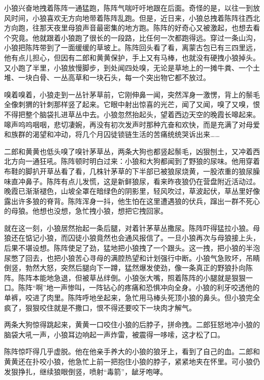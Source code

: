 \par 
\par 小狼兴奋地拽着陈阵一通猛跑，陈阵气喘吁吁地跟在后面。奇怪的是，以往一到放风时间，小狼喜欢无方向地带着陈阵乱跑。但是，近日来，小狼总拽着陈阵往西北方向跑，往那天夜里母狼声音最密集的地方跑。陈阵的好奇心又被激起，也想去看个究竟。他就跟着小狼跑了很长的一段路，比任何一次都跑得远。穿过一条山沟，小狼把陈阵带到了一面缓缓的草坡上。陈阵回头看了看，离蒙古包已有三四里远，他有点儿担心，但因有二郎和黄黄保护，手上又有马棒，也就没有硬拽小狼掉头。又小跑了半里，小狼放慢脚步，到处闻四处嗅，无论是草地上的一摊牛粪、一个土堆、一块白骨、一丛高草和一块石头，每一个突出物它都不放过。
\par 嗅着嗅着，小狼走到一丛针茅草前，它刚伸鼻一闻，突然浑身一激愣，背上的鬃毛全像刺猬的针刺那样竖了起来。它眼中射出惊喜的光芒，闻了又闻，嗅了又嗅，恨不得把整个脑袋扎进草丛中去。小狼忽然抬起头，望着西边天空的晚霞长嗥起来。嗥声呜呜咽咽，悲切凄婉，再没有初次发声时那种亢奋和欢快，而是充满了对母爱和族群的渴望和冲动，将几个月囚徒锁链生活的苦痛统统哭诉出来……
\par 二郎和黄黄也低头嗅了嗅针茅草丛，两条大狗也都竖起鬃毛，凶狠刨土，又冲着西北方向一通狂吼。陈阵顿时明白过来：小狼和大狗都闻到了野狼的尿味。他用穿着布鞋的脚扒开草丛看了看，几株针茅草的下半部已被狼尿烧黄，一股浓重的狼尿臊味直冲鼻子。陈阵有点儿发慌，这是新鲜狼尿，看来昨夜狼仍在营盘附近活动过。晚霞已渐渐褪色，山坡全罩在暗绿色的阴影里，轻风吹过，草波起伏，草丛里好像露出许多狼的脊背。陈阵浑身一抖，他生怕在这里遭遇狼的伏兵，蹿出一群不死心的母狼。他想也没想，急忙拽小狼，想把它拽回家。
\par 就在这一刻，小狼居然抬起一条后腿，对着针茅草丛撒尿。陈阵吓得猛拉小狼。母狼还在惦记小狼，而囚徒小狼竟然也会通风报信了。一旦小狼再次与母狼接上头，后果不堪设想。陈阵使足了劲，猛地把小狼拽了一个跟头。这一拽，把小狼的半泡尿憋了回去，也把小狼苦心寻母的满腔热望和计划强行中断。小狼气急败坏，吊睛倒竖，勃然大怒，突然后腿向下一蹲，猛然爆发使劲，像一条真正的野狼扑向陈阵。陈阵本能地急退，但被草丛绊倒。小狼张大嘴，照着陈阵的小腿就是狠狠一口。陈阵“啊”地一声惨叫，一阵钻心的疼痛和恐惧冲向全身。小狼的利牙咬透他的单裤，咬进了肉里。陈阵呼地坐起来，急忙用马棒头死顶小狼的鼻头。但小狼完全疯了，狠狠咬住就是不撒口，恨不得还要咬下一块肉才解气。
\par 两条大狗惊得跳起来，黄黄一口咬住小狼的后脖子，拼命拽。二郎狂怒地冲小狼的脑袋大吼一声，小狼耳边响起一声炸雷，被震得一哆嗦，这才松了口。
\par 陈阵惊吓得几乎虚脱。他在他亲手养大的小狼的狼牙上，看到了自己的血。二郎和黄黄还在扑咬小狼，他急忙上前一把抱住小狼的脖子，紧紧地夹在怀里。可小狼仍发狠挣扎，继续狼眼倒竖，喷射“毒箭”，龇牙咆哮。
